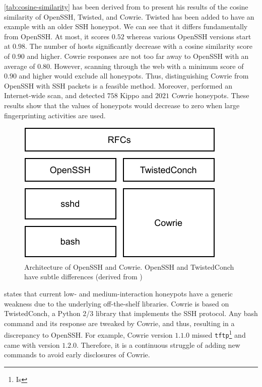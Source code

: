 \autoref{tab:cosine-similarity} has been derived from \citet{vetterl2020} to present his results of the cosine similarity of OpenSSH, Twisted, and Cowrie.
Twisted has been added to have an example with an older SSH honeypot.
We can see that it differs fundamentally from OpenSSH.
At most, it scores $0.52$ whereas various OpenSSH versions start at $0.98$.
The number of hosts significantly decrease with a cosine similarity score of $0.90$ and higher.
Cowrie responses are not too far away to OpenSSH with an average of $0.80$.
However, scanning through the web with a minimum score of $0.90$ and higher would exclude all honeypots.
Thus, distinguishing Cowrie from OpenSSH with SSH packets is a feasible method.
Moreover, \citet{vetterl2020} performed an Internet-wide scan, and detected $758$ Kippo and $2021$ Cowrie honeypots.
These results show that the values of honeypots would decrease to zero when large fingerprinting activities are used.

\begin{figure}[ht]
    \centering
    \includegraphics{figures/cowrie-openssh.pdf}
    \caption[Architecture of OpenSSH and Cowrie]{Architecture of OpenSSH and Cowrie. OpenSSH and TwistedConch have subtle differences (derived from \cite{vetterl2020})}
    \label{fig:cowrie-openssh}
\end{figure}

\citet{vetterl2020} states that current low- and medium-interaction honeypots have a generic weakness due to the underlying off-the-shelf libraries.
Cowrie is based on TwistedConch, a Python 2/3 library that implements the SSH protocol.
Any bash command and its response are tweaked by Cowrie, and thus, resulting in a discrepancy to OpenSSH.
For example, Cowrie version $1.1.0$ missed \verb|tftp|\footnote{Is } and came with version $1.2.0$.
Therefore, it is a continuous struggle of adding new commands to avoid early disclosures of Cowrie.

